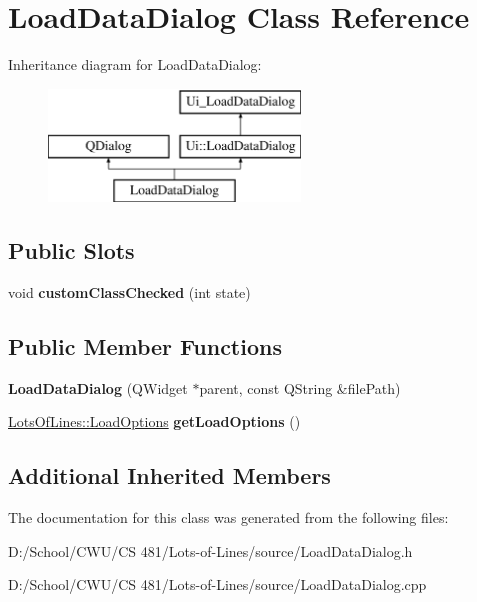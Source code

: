 \hypertarget{class_load_data_dialog}{}\section{Load\+Data\+Dialog Class Reference}
\label{class_load_data_dialog}
Inheritance diagram for Load\+Data\+Dialog\+:\begin{figure}[H]
\begin{center}
\leavevmode
\includegraphics[height=3.000000cm]{class_load_data_dialog}
\end{center}
\end{figure}
\subsection*{Public Slots}
\begin{DoxyCompactItemize}
\item 
void {\bfseries custom\+Class\+Checked} (int state)\hypertarget{class_load_data_dialog_a16696e5f01c2935a4a30094069914f82}{}\label{class_load_data_dialog_a16696e5f01c2935a4a30094069914f82}

\end{DoxyCompactItemize}
\subsection*{Public Member Functions}
\begin{DoxyCompactItemize}
\item 
{\bfseries Load\+Data\+Dialog} (Q\+Widget $\ast$parent, const Q\+String \&file\+Path)\hypertarget{class_load_data_dialog_aff71f0e7a55c65550aa7247b5378da34}{}\label{class_load_data_dialog_aff71f0e7a55c65550aa7247b5378da34}

\item 
\hyperlink{struct_lots_of_lines_1_1_load_options}{Lots\+Of\+Lines\+::\+Load\+Options} {\bfseries get\+Load\+Options} ()\hypertarget{class_load_data_dialog_a520548008761823248425b849ec9eae2}{}\label{class_load_data_dialog_a520548008761823248425b849ec9eae2}

\end{DoxyCompactItemize}
\subsection*{Additional Inherited Members}


The documentation for this class was generated from the following files\+:\begin{DoxyCompactItemize}
\item 
D\+:/\+School/\+C\+W\+U/\+C\+S 481/\+Lots-\/of-\/\+Lines/source/Load\+Data\+Dialog.\+h\item 
D\+:/\+School/\+C\+W\+U/\+C\+S 481/\+Lots-\/of-\/\+Lines/source/Load\+Data\+Dialog.\+cpp\end{DoxyCompactItemize}
